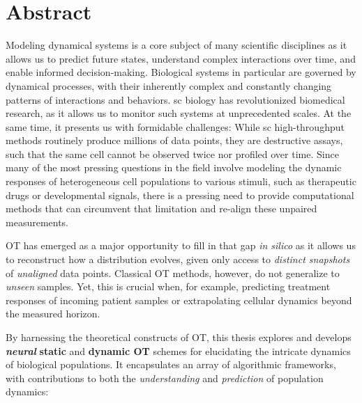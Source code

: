 \begingroup
\let\clearpage\relax
\let\cleardoublepage\relax
\let\cleardoublepage\relax

\chapter*{Abstract}

Modeling dynamical systems is a core subject of many scientific disciplines as it allows us to predict future states, understand complex interactions over time, and enable informed decision-making.
Biological systems in particular are governed by dynamical processes, with their inherently complex and constantly changing patterns of interactions and behaviors.
\Acrlong{sc} biology has revolutionized biomedical research, as it allows us to monitor such systems at unprecedented scales.
At the same time, it presents us with formidable challenges: While \acrlong{sc} high-throughput methods routinely produce millions of data points, they are destructive assays, such that the same cell cannot be observed twice nor profiled over time.
Since many of the most pressing questions in the field involve modeling the dynamic responses of heterogeneous cell populations to various stimuli, such as therapeutic drugs or developmental signals, there is a pressing need to provide computational methods that can circumvent that limitation and re-align these unpaired measurements.

\Acrfull{OT} has emerged as a major opportunity to fill in that gap \textit{in silico} as it allows us to reconstruct how a distribution evolves, given only access to \emph{distinct snapshots} of \emph{unaligned} data points.
Classical \acrshort{OT} methods, however, do not generalize to \emph{unseen} samples. Yet, this is crucial when, for example, predicting treatment responses of incoming patient samples or extrapolating cellular dynamics beyond the measured horizon.

By harnessing the theoretical constructs of \acrshort{OT}, this thesis explores and develops \textbf{\emph{neural}} \textbf{static} and \textbf{dynamic \acrlong{OT}} schemes for elucidating the intricate dynamics of biological populations. It encapsulates an array of algorithmic frameworks, with contributions to both the \textit{understanding} and \textit{prediction} of population dynamics:

